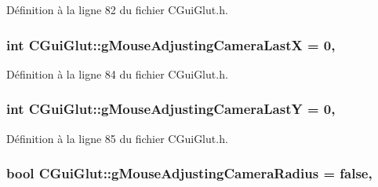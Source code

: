 Définition à la ligne 82 du fichier C\-Gui\-Glut.\-h.

\hypertarget{class_c_gui_glut_ae55158d240b75d6bceee346e0155de84}{
\subsubsection[{g\-Mouse\-Adjusting\-Camera\-Last\-X}]{\setlength{\rightskip}{0pt plus 5cm}int C\-Gui\-Glut\-::g\-Mouse\-Adjusting\-Camera\-Last\-X = 0\hspace{0.3cm}{\ttfamily [static]}, {\ttfamily [protected]}}}\label{class_c_gui_glut_ae55158d240b75d6bceee346e0155de84}


Définition à la ligne 84 du fichier C\-Gui\-Glut.\-h.

\hypertarget{class_c_gui_glut_a24c5393cda1ad9cb013ba13f43fc4a25}{
\subsubsection[{g\-Mouse\-Adjusting\-Camera\-Last\-Y}]{\setlength{\rightskip}{0pt plus 5cm}int C\-Gui\-Glut\-::g\-Mouse\-Adjusting\-Camera\-Last\-Y = 0\hspace{0.3cm}{\ttfamily [static]}, {\ttfamily [protected]}}}\label{class_c_gui_glut_a24c5393cda1ad9cb013ba13f43fc4a25}


Définition à la ligne 85 du fichier C\-Gui\-Glut.\-h.

\hypertarget{class_c_gui_glut_a8d68818a05092a8b55e0ba7003485e3f}{
\subsubsection[{g\-Mouse\-Adjusting\-Camera\-Radius}]{\setlength{\rightskip}{0pt plus 5cm}bool C\-Gui\-Glut\-::g\-Mouse\-Adjusting\-Camera\-Radius = false\hspace{0.3cm}{\ttfamily [static]}, {\ttfamily [protected]}}}\label{class_c_gui_glut_a8d68818a05092a8b55e0ba7003485e3f}


